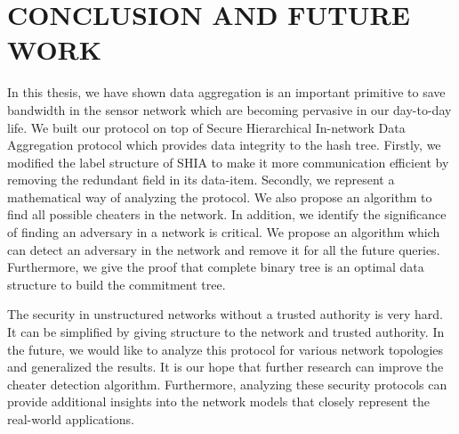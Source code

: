 \chapter{CONCLUSION AND FUTURE WORK} 
\label{cha:conclusion}

	In this thesis, we have shown data aggregation is an important primitive to save bandwidth in the sensor network which are becoming pervasive in our day-to-day life.
	We built our protocol on top of Secure Hierarchical In-network Data Aggregation protocol which provides data integrity to the hash tree.
	Firstly, we modified the label structure of SHIA to make it more communication efficient by removing the redundant field in its data-item.
	Secondly, we represent a mathematical way of analyzing the protocol. 
	We also propose an algorithm to find all possible cheaters in the network.
	In addition, we identify the significance of finding an adversary in a network is critical. 
	We propose an algorithm which can detect an adversary in the network and remove it for all the future queries.
	Furthermore, we give the proof that complete binary tree is an optimal data structure to build the commitment tree.

	The security in unstructured networks without a trusted authority is very hard.
	It can be simplified by giving structure to the network and trusted authority.
	In the future, we would like to analyze this protocol for various network topologies and generalized the results.
	It is our hope that further research can improve the cheater detection algorithm.
	Furthermore, analyzing these security protocols can provide additional insights into the network models that closely represent the real-world applications.  
